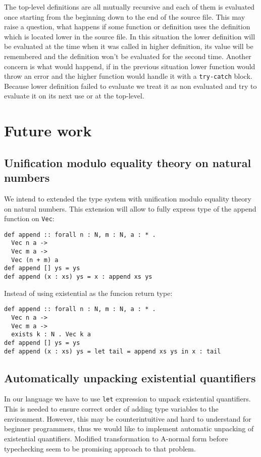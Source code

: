 \documentclass[declaration,shortabstract,english]{iithesis}
\begin{document}
The top-level definitions are all mutually recursive and each of them is evaluated once starting from the beginning
down to the end of the source file. This may raise a question, what happens if some function or definition uses the definition which is located
lower in the source file. In this situation the lower definition will be evaluated at the time when it was called in higher definition,
its value will be remembered and the definition won't be evaluated for the second time.
Another concern is what would happend, if in the previous situation lower function would throw an error and the higher function would
handle it with a \verb+try-catch+ block. Because lower definition failed to evaluate we treat it as non evaluated and try to evaluate it
on its next use or at the top-level.

\chapter{Future work}
\section{Unification modulo equality theory on natural numbers}
We intend to extended the type system with unification modulo equality theory on natural numbers.
This extension will allow to fully express type of the append function on \verb+Vec+:
\begin{verbatim}
def append :: forall n : N, m : N, a : * .
  Vec n a ->
  Vec m a ->
  Vec (n + m) a
def append [] ys = ys
def append (x : xs) ys = x : append xs ys
\end{verbatim}
Instead of using existential as the funcion return type:
\begin{verbatim}
def append :: forall n : N, m : N, a : * .
  Vec n a ->
  Vec m a ->
  exists k : N . Vec k a
def append [] ys = ys
def append (x : xs) ys = let tail = append xs ys in x : tail
\end{verbatim}
\section{Automatically unpacking existential quantifiers}
In our language we have to use \verb+let+ expression to unpack existential quantifiers.
This is needed to ensure correct order of adding type variables to the environment.
However, this may be counterintuitive and hard to understand for beginner programmers, thus
we would like to implement automatic unpacking of existential quantifiers.
Modified transformation to A-normal form before typechecking seem to be promising approach to that problem.
\end{document}
